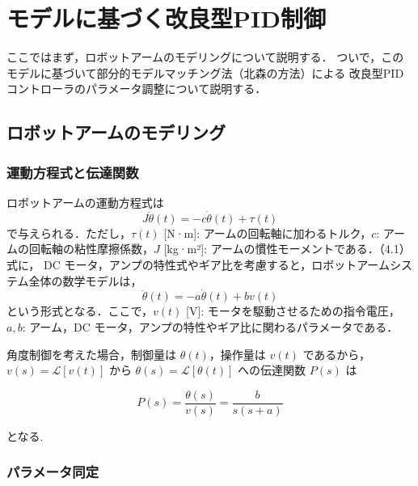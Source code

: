 
\section{モデルに基づく改良型PID制御}

ここではまず，ロボットアームのモデリングについて説明する．
ついで，このモデルに基づいて部分的モデルマッチング法（北森の方法）による
改良型PIDコントローラのパラメータ調整について説明する．

\subsection{ロボットアームのモデリング}
\subsubsection{運動方程式と伝達関数}
ロボットアームの運動方程式は
\begin{equation}
  J \ddot{\theta}(t) = -c \dot{\theta}(t) + \tau(t)
  \tag{4.1}
\end{equation}
で与えられる．ただし，$\tau(t)$ [N·m]: アームの回転軸に加わるトルク，$c$: アームの回転軸の粘性摩擦係数，$J$ [kg·m²]: アームの慣性モーメントである．（4.1）式に，
DC モータ，アンプの特性式やギア比を考慮すると，ロボットアームシステム全体の数学モデルは，
\begin{equation}
  \ddot{\theta}(t) = -a \dot{\theta}(t) + b v(t)
  \tag{4.2}
\end{equation}
という形式となる．ここで，$v(t)$ [V]: モータを駆動させるための指令電圧，
$a, b$: アーム，DC モータ，アンプの特性やギア比に関わるパラメータである．

角度制御を考えた場合，制御量は $\theta(t)$，操作量は $v(t)$ であるから，
$v(s) = \mathcal{L}[v(t)]$ から $\theta(s) = \mathcal{L}[\theta(t)]$ への伝達関数 
$P(s)$ は

\begin{equation}
  P(s) = \frac{\theta(s)}{v(s)} = \frac{b}{s(s+a)}
  \tag{4.3}
\end{equation}

となる.

\subsubsection{パラメータ同定}

